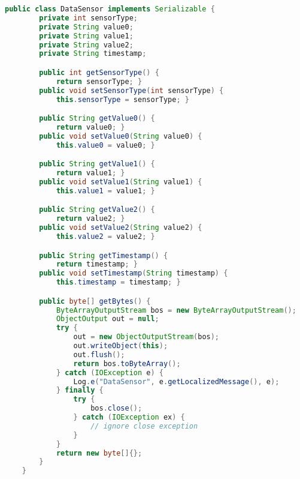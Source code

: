 \begin{lstlisting}[language=Java,  basicstyle=\footnotesize]
    public class DataSensor implements Serializable {
        private int sensorType;
        private String value0;
        private String value1;
        private String value2;
        private String timestamp;

        public int getSensorType() {
            return sensorType; }
        public void setSensorType(int sensorType) {
            this.sensorType = sensorType; }

        public String getValue0() {
            return value0; }
        public void setValue0(String value0) {
            this.value0 = value0; }

        public String getValue1() {
            return value1; }
        public void setValue1(String value1) {
            this.value1 = value1; }

        public String getValue2() {
            return value2; }
        public void setValue2(String value2) {
            this.value2 = value2; }

        public String getTimestamp() {
            return timestamp; }
        public void setTimestamp(String timestamp) {
            this.timestamp = timestamp; }

        public byte[] getBytes() {
            ByteArrayOutputStream bos = new ByteArrayOutputStream();
            ObjectOutput out = null;
            try {
                out = new ObjectOutputStream(bos);
                out.writeObject(this);
                out.flush();
                return bos.toByteArray();
            } catch (IOException e) {
                Log.e("DataSensor", e.getLocalizedMessage(), e);
            } finally {
                try {
                    bos.close();
                } catch (IOException ex) {
                    // ignore close exception
                }
            }
            return new byte[]{};
        }
    }
\end{lstlisting}